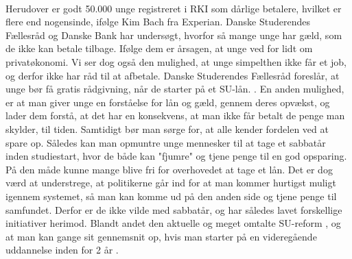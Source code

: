 \\
Herudover er godt 50.000 unge registreret i RKI som dårlige betalere, hvilket er flere end nogensinde, ifølge Kim Bach fra Experian. Danske Studerendes Fællesråd og Danske Bank har undersøgt, hvorfor så mange unge har gæld, som de ikke kan betale tilbage. Ifølge dem er årsagen, at unge ved for lidt om privatøkonomi. Vi ser dog også den mulighed, at unge simpelthen ikke får et job, og derfor ikke har råd til at afbetale. Danske Studerendes Fællesråd foreslår, at unge bør få gratis rådgivning, når de starter på et SU-lån. \cite{dr.dk}. En anden mulighed, er at man giver unge en forståelse for lån og gæld, gennem deres opvækst, og lader dem forstå, at det har en konsekvens, at man ikke får betalt de penge man skylder, til tiden. Samtidigt bør man sørge for, at alle kender fordelen ved at spare op. Således kan man opmuntre unge mennesker til at tage et sabbatår inden studiestart, hvor de både kan "fjumre" og tjene penge til en god opsparing. På den måde kunne mange blive fri for overhovedet at tage et lån.
Det er dog værd at understrege, at politikerne går ind for at man kommer hurtigst muligt igennem systemet, så man kan komme ud på den anden side og tjene penge til samfundet. Derfor er de ikke vilde med sabbatår, og har således lavet forskellige initiativer herimod. Blandt andet den aktuelle og meget omtalte SU-reform \cite{SUreform}, og at man kan gange sit gennemsnit op, hvis man starter på en videregående uddannelse inden for 2 år \cite{SabbatAar}.
 